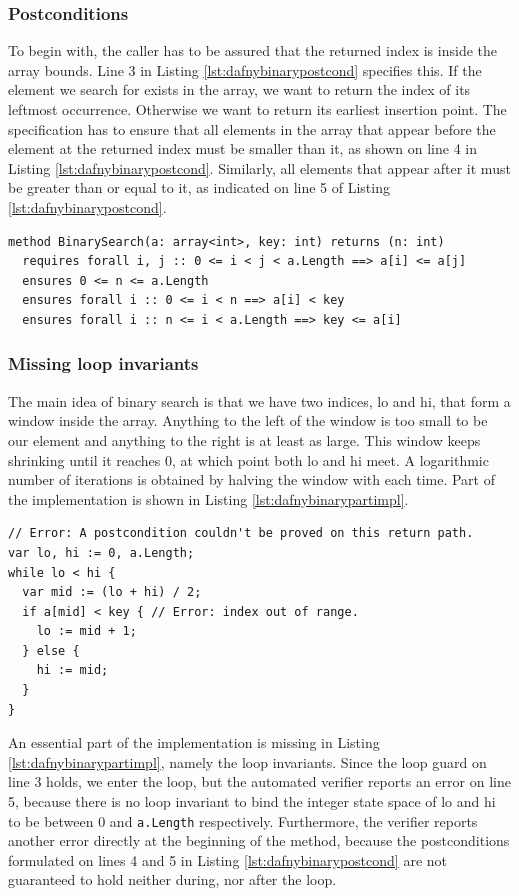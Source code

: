 \documentclass[a4paper]{article}
\begin{document}
\subsubsection{Postconditions}
To begin with, the caller has to be assured that the returned index is inside the array bounds. Line 3 in Listing
\ref{lst:dafnybinarypostcond} specifies this. If the element we search for exists in the array, we want to
return the index of its leftmost occurrence. Otherwise we want to return its earliest insertion point.
The specification has to ensure that all elements in the array that appear before the element at the returned
index must be smaller than it, as shown on line 4 in Listing \ref{lst:dafnybinarypostcond}. Similarly,
all elements that appear after it must be greater than or equal to it,
as indicated on line 5 of Listing \ref{lst:dafnybinarypostcond}.
\begin{lstlisting}[style=dafnystyle, caption={Binary search pre- and postconditions.}, label={lst:dafnybinarypostcond}]
method BinarySearch(a: array<int>, key: int) returns (n: int)
  requires forall i, j :: 0 <= i < j < a.Length ==> a[i] <= a[j]
  ensures 0 <= n <= a.Length
  ensures forall i :: 0 <= i < n ==> a[i] < key
  ensures forall i :: n <= i < a.Length ==> key <= a[i]
\end{lstlisting}
\subsubsection{Missing loop invariants}
The main idea of binary search is that we have two indices, lo and hi, that form a window inside the array. Anything
to the left of the window is too small to be our element and anything to the right is at least as large. This
window keeps shrinking until it reaches 0, at which point both lo and hi meet. A logarithmic number of iterations is
obtained by halving the window with each time. Part of the implementation is shown in Listing \ref{lst:dafnybinarypartimpl}.
\begin{lstlisting}[style=dafnystyle, caption={Binary search implementation with verifier errors.}, label={lst:dafnybinarypartimpl}]
// Error: A postcondition couldn't be proved on this return path.
var lo, hi := 0, a.Length;
while lo < hi {
  var mid := (lo + hi) / 2;
  if a[mid] < key { // Error: index out of range.
    lo := mid + 1;
  } else {
    hi := mid;
  }
}
\end{lstlisting}
An essential part of the implementation is missing in Listing \ref{lst:dafnybinarypartimpl}, namely the loop
invariants. Since the loop guard on line 3 holds, we enter the loop, but the automated verifier reports an error on
line 5, because there is no loop invariant to bind the integer state space of lo and hi to be
between 0 and \texttt{a.Length} respectively. Furthermore, the verifier reports another error directly at the
beginning of the method, because the postconditions formulated on lines 4 and 5 in Listing \ref{lst:dafnybinarypostcond}
are not guaranteed to hold neither during, nor after the loop.
\end{document}
